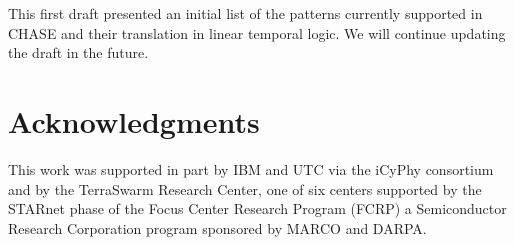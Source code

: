 \documentclass[journal]{IEEEtran}
\begin{document}
This first draft presented an initial list of the patterns currently supported in CHASE and their translation in linear temporal logic. We will continue updating the draft in the future.  

\section{Acknowledgments}
This work was supported in part by IBM and UTC via
the iCyPhy consortium and by the TerraSwarm Research Center, one of six centers
supported by the STARnet phase of the Focus Center Research Program (FCRP) a
Semiconductor Research Corporation program sponsored by MARCO and DARPA.


% 

\end{document}

